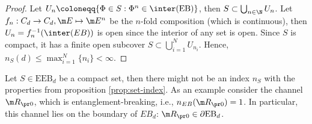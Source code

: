 \begin{proof}
    Let $U_n\coloneqq \{\Phi \in S: \Phi^n \in \inter(\text{EB})\}$, then $S \subset \bigcup_{n\in \N}U_n$. Let $f_n:C_d \rightarrow C_d, \m E \mapsto \m E^n$ be the $n$-fold composition (which is continuous), then $U_n = f_n^{-1}(\inter(EB))$ is open since the interior of any set is open. Since $S$ is compact, it has a finite open subcover $S \subset \bigcup_{i=1}^N U_{n_i}$. Hence, $n_S(d) \leq \max_{i=1}^N \{n_i\}< \infty$.
\end{proof}
\begin{ex}
    Let $S \in \text{EEB}_d$ be a compact set, then there might not be an index $n_S$ with the properties from proposition \ref{prop:set-index}. As an example consider the channel $\m R_{\pr 0}$, which is entanglement-breaking, i.e., $n_{EB}(\m R_{\pr 0})=1$. In particular, this channel lies on the boundary of $EB_d$: $\m R_{\pr 0} \in \partial \text{EB}_d$.
\end{ex}
